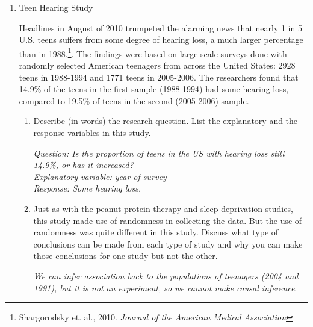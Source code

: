 \begin{enumerate}
  \begin{center}
  {\bf  More Examples}
  \end{center}

The following exercises are adapted from the CATALST curriculum at
\url{https://github.com/zief0002/Statistical-Thinking}. 


\item Teen Hearing Study

  Headlines in August of 2010 trumpeted the alarming news that nearly
  1 in 5 U.S. teens suffers from some degree of hearing loss, a much
  larger percentage than in 1988.\footnote{ Shargorodsky et. al.,
    2010. {\it Journal of the American Medical Association}}.  The
  findings were based on large-scale surveys done with randomly
  selected American teenagers from across the United States: 2928
  teens in 1988-1994 and 1771 teens in 2005-2006.  The researchers
  found that 14.9\% of the teens in the first sample (1988-1994) had
  some hearing loss, compared to 19.5\% of teens in the second
  (2005-2006) sample.
\begin{enumerate}
\item  Describe (in words) the research question. List the explanatory and
  the response variables in this study.   
 \begin{students}
  \vspace{2cm}
\end{students}

\begin{key}
  {\it Question:  Is the proportion of teens in the US with hearing
    loss still 14.9\%, or has it increased?\\
    Explanatory variable: year of survey\\
    Response: Some hearing loss.}
\end{key}
\item  Just as with the peanut protein therapy and sleep deprivation studies,
  this study made use of randomness in collecting the data. But the
  use of randomness was quite different in this study.  Discuss what
  type of conclusions can be made from each type of study and why you
  can make those conclusions for one study but not the other.  
 \begin{students}
  \vspace{2cm}
\end{students} 

\begin{key}
  {\it We can infer association back to the populations of teenagers
    (2004 and 1991), but it is not an experiment, so we cannot make
    causal inference}.
\end{key}


\end{enumerate}
\end{enumerate}
